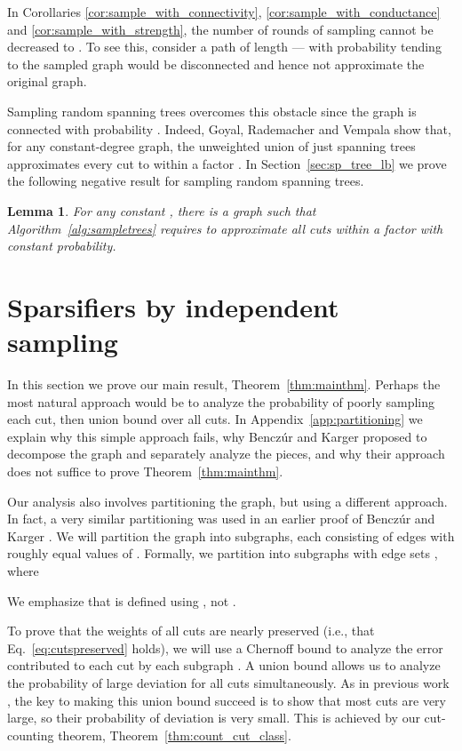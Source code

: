 \documentclass[11pt]{article}
\numberwithin{equation}{section}
\newtheorem{lemma}[theorem]{Lemma}
\newcommand{\Algorithm}[1]{Algorithm~\ref{alg:#1}}
\newcommand{\Appendix}[1]{Appendix~\ref{app:#1}}
\newcommand{\Equation}[1]{Eq.~\eqref{eq:#1}}
\newcommand{\LemmaName}[1]{\label{lem:#1}}
\newcommand{\SectionName}[1]{\label{sec:#1}}
\newcommand{\Section}[1]{Section~\ref{sec:#1}}
\newcommand{\Theorem}[1]{Theorem~\ref{thm:#1}}
\begin{document}
In Corollaries \ref{cor:sample_with_connectivity}, \ref{cor:sample_with_conductance}
and \ref{cor:sample_with_strength},
the number of rounds of sampling  cannot be decreased to .
To see this, consider a path of length  --- with probability tending to 
the sampled graph would be disconnected and hence not approximate the original graph.

Sampling random spanning trees overcomes this obstacle since the graph is
connected with probability .
Indeed, Goyal, Rademacher and Vempala \cite{GoyalRV09} show that, for any constant-degree graph,
the unweighted union of just  spanning trees
approximates every cut to within a factor .
In \Section{sp_tree_lb} we prove the following negative result for sampling random spanning trees.

\begin{lemma}
\LemmaName{sp_tree_lb}
For any constant ,
there is a graph such that \Algorithm{sampletrees}
requires  to approximate all cuts within a factor 
with constant probability.
\end{lemma}







\section{Sparsifiers by independent sampling}
\SectionName{sample_with_connectivity}

In this section we prove our main result, \Theorem{mainthm}.
Perhaps the most natural approach would be to analyze the probability of poorly
sampling each cut, then union bound over all cuts.
In \Appendix{partitioning} we explain why this simple approach fails,
why Bencz\'ur and Karger \cite{BK} proposed to decompose the graph and separately analyze the
pieces,
and why their approach does not suffice to prove \Theorem{mainthm}.

Our analysis also involves partitioning the graph, but using a different approach.
In fact, a very similar partitioning was used in an earlier proof of Bencz\'ur and Karger 
\cite[\S 3.2]{BKConf} \cite[\S 9.3.2]{BenczurThesis}.
We will partition the graph into subgraphs,
each consisting of edges with roughly equal values of .
Formally, we partition  into subgraphs with edge sets ,
where

We emphasize that  is defined using , not .

To prove that the weights of all cuts are nearly preserved
(i.e., that \Equation{cutspreserved} holds),
we will use a Chernoff bound to analyze the error contributed to each cut by each subgraph .
A union bound allows us to analyze the probability of large deviation
for all cuts simultaneously.
As in previous work \cite{KargerSkel,BK}, 
the key to making this union bound succeed is to show that most cuts are very large,
so their probability of deviation is very small.
This is achieved by our cut-counting theorem, \Theorem{count_cut_class}.
\end{document}

